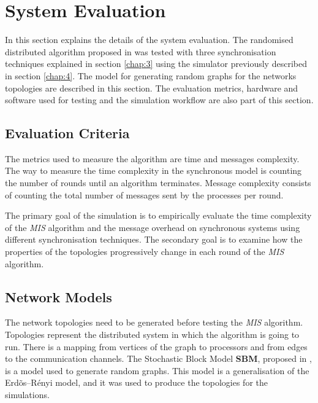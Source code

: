 \section{System Evaluation}
\label{chap:5}

In this section explains the details of the system evaluation. The randomised distributed algorithm proposed in \cite{yves2009optimal} was tested with three synchronisation techniques explained in section \ref{chap:3} using the simulator previously described in section \ref{chap:4}. The model for generating random graphs for the networks topologies are described in this section. The evaluation metrics, hardware and software used for testing and the simulation workflow are also part of this section.   


\subsection{Evaluation Criteria}



The metrics used to measure the algorithm are time and messages complexity. The way to measure the time complexity in the synchronous model is counting the number of rounds until an algorithm terminates. Message complexity consists of counting the total number of messages sent by the processes per round.

The primary goal of the simulation is to empirically evaluate the time complexity of the \textit{MIS} algorithm and the message overhead on synchronous systems using different synchronisation techniques. The secondary goal is to examine how the properties of the topologies progressively change in each round of the \textit{MIS} algorithm.


\subsection{Network Models}
\label{sec:topology}


The network topologies need to be generated before testing the \textit{MIS} algorithm. Topologies represent the distributed system in which the algorithm is going to run. There is a mapping from vertices of the graph to processors and from edges to the communication channels.  The Stochastic Block Model \textbf{SBM}, proposed in \cite{holland1983stochastic},  is a model used to generate random graphs. This model is a generalisation of the Erd\~os--R\'enyi model, and it was used to produce the topologies for the simulations. 

